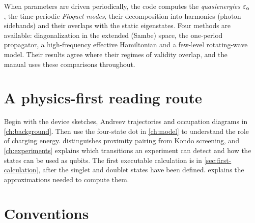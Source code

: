 When parameters are driven periodically, the code computes the \emph{quasienergies}
$\varepsilon_\alpha$, the time-periodic \emph{Floquet modes}, their decomposition into
harmonics (photon sidebands) and their overlaps with the static eigenstates. Four
methods are available: diagonalization in the extended (Sambe) space, the one-period
propagator, a high-frequency effective Hamiltonian and a few-level rotating-wave model.
Their results agree where their regimes of validity overlap, and the manual uses these
comparisons throughout.

\section{A physics-first reading route}

Begin with the device sketches, Andreev trajectories and occupation diagrams in
\cref{ch:background}. Then use the four-state dot in \cref{ch:model} to understand
the role of charging energy.  distinguishes proximity pairing
from Kondo screening, and \cref{ch:experiments} explains which transitions an
experiment can detect and how the states can be used as qubits. The first executable calculation is
in \cref{sec:first-calculation}, after the singlet and doublet states have been
defined.  explains the approximations needed to compute them.

\section{Conventions}


